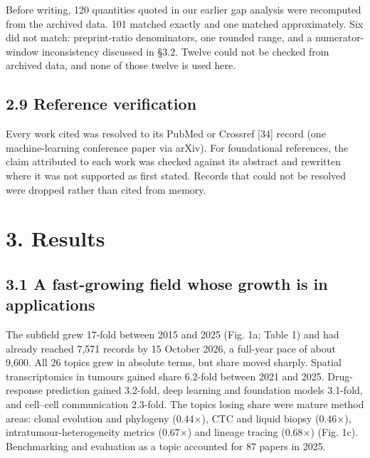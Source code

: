 \documentclass[11pt]{article}
\begin{document}
Before writing, 120 quantities quoted in our earlier gap analysis were
recomputed from the archived data. 101 matched exactly and one matched
approximately. Six did not match: preprint-ratio denominators, one
rounded range, and a numerator-window inconsistency discussed in §3.2.
Twelve could not be checked from archived data, and none of those twelve
is used here.

\subsection{2.9 Reference verification}\label{reference-verification}

Every work cited was resolved to its PubMed or Crossref {[}34{]} record
(one machine-learning conference paper via arXiv). For foundational
references, the claim attributed to each work was checked against its
abstract and rewritten where it was not supported as first stated.
Records that could not be resolved were dropped rather than cited from
memory.

\section{3. Results}\label{results}

\subsection{3.1 A fast-growing field whose growth is in applications}\label{a-fast-growing-field-whose-growth-is-in-applications}

The subfield grew 17-fold between 2015 and 2025 (Fig. 1a; Table 1) and
had already reached 7,571 records by 15 October 2026, a full-year pace
of about 9,600. All 26 topics grew in absolute terms, but share moved
sharply. Spatial transcriptomics in tumours gained share 6.2-fold
between 2021 and 2025. Drug-response prediction gained 3.2-fold, deep
learning and foundation models 3.1-fold, and cell--cell communication
2.3-fold. The topics losing share were mature method areas: clonal
evolution and phylogeny (0.44×), CTC and liquid biopsy (0.46×),
intratumour-heterogeneity metrics (0.67×) and lineage tracing (0.68×)
(Fig. 1c). Benchmarking and evaluation as a topic accounted for 87
papers in 2025.
\end{document}
